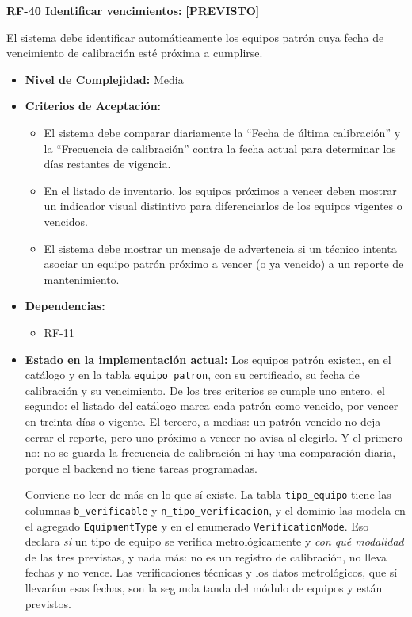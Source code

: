\documentclass[12pt,a4paper]{article}
\newcommand{\estadoPrevisto}{\textcolor{mainGray}{\textbf{[PREVISTO]}}}
\begin{document}
\textbf{RF-40 Identificar vencimientos:} \estadoPrevisto{}

El sistema debe identificar automáticamente los equipos patrón cuya fecha de vencimiento de calibración esté próxima a cumplirse.

\begin{itemize}
  \item \textbf{Nivel de Complejidad:} Media

  \item \textbf{Criterios de Aceptación:}
  \begin{itemize}
    \item El sistema debe comparar diariamente la ``Fecha de última calibración'' y la ``Frecuencia de calibración'' contra la fecha actual para determinar los días restantes de vigencia.
    \item En el listado de inventario, los equipos próximos a vencer deben mostrar un indicador visual distintivo para diferenciarlos de los equipos vigentes o vencidos.
    \item El sistema debe mostrar un mensaje de advertencia si un técnico intenta asociar un equipo patrón próximo a vencer (o ya vencido) a un reporte de mantenimiento.
  \end{itemize}

  \item \textbf{Dependencias:}
  \begin{itemize}
    \item RF-11
  \end{itemize}

  \item \textbf{Estado en la implementación actual:} Los equipos patrón existen, en el catálogo y en la tabla \texttt{equipo\_patron}, con su certificado, su fecha de calibración y su vencimiento. De los tres criterios se cumple uno entero, el segundo: el listado del catálogo marca cada patrón como vencido, por vencer en treinta días o vigente. El tercero, a medias: un patrón vencido no deja cerrar el reporte, pero uno próximo a vencer no avisa al elegirlo. Y el primero no: no se guarda la frecuencia de calibración ni hay una comparación diaria, porque el backend no tiene tareas programadas.

  Conviene no leer de más en lo que sí existe. La tabla \texttt{tipo\_equipo} tiene las columnas \texttt{b\_verificable} y \texttt{n\_tipo\_verificacion}, y el dominio las modela en el agregado \texttt{EquipmentType} y en el enumerado \texttt{VerificationMode}. Eso declara \emph{si} un tipo de equipo se verifica metrológicamente y \emph{con qué modalidad} de las tres previstas, y nada más: no es un registro de calibración, no lleva fechas y no vence. Las verificaciones técnicas y los datos metrológicos, que sí llevarían esas fechas, son la segunda tanda del módulo de equipos y están previstos.
\end{itemize}
\end{document}

